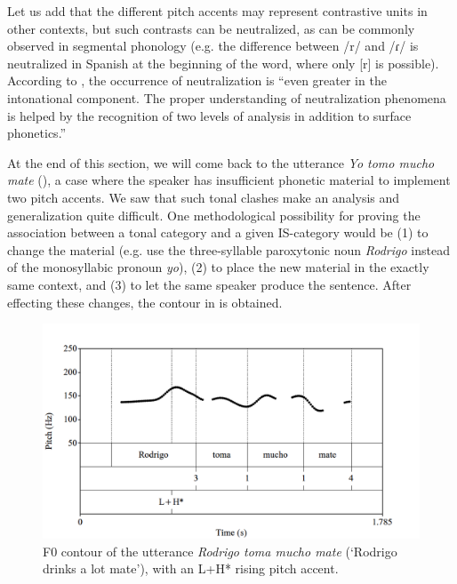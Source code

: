 \documentclass[output=paper]{langsci/langscibook}
\begin{document}
%
     
Let us add that the different pitch accents may represent contrastive units in other contexts, but such contrasts can be neutralized, as can be commonly observed in segmental phonology (e.g. the difference between /r/ and /ɾ/ is neutralized in Spanish at the beginning of the word, where only [r] is possible). According to  \citet[13]{Hualde2016}, the occurrence of neutralization is ``even greater in the intonational component. The proper understanding of neutralization phenomena is helped by the recognition of two levels of analysis in addition to surface phonetics.''

At the end of this section, we will come back to the utterance \textit{Yo tomo mucho mate} (), a case where the speaker has insufficient phonetic material to implement two pitch accents. We saw that such tonal clashes make an analysis and generalization quite difficult. One methodological possibility for proving the association between a tonal category and a given IS-category would be
(1) to change the material (e.g. use the three-syllable paroxytonic noun \textit{Rodrigo} instead of the monosyllabic pronoun \textit{yo}),
(2) to place the new material in the exactly same context, and
(3) to let the same speaker produce the sentence. After effecting these changes, the contour in  is obtained.

  

\begin{figure}
\includegraphics[width=\textwidth]{figures/pes-img21.png}
  \caption{F0 contour of the utterance \textit{Rodrigo toma mucho mate} (‘Rodrigo drinks a lot {mate’}), with an L+H* rising pitch accent.}
  \label{fig:pes:21}
\end{figure}
\end{document}
